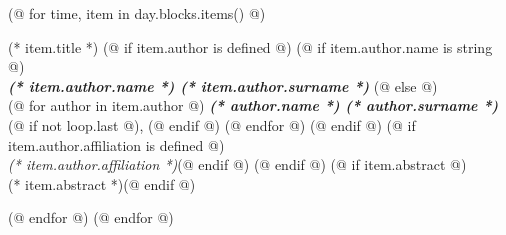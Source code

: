 \documentclass[a4paper]{report}
\begin{document}
        (@ for time, item in day.blocks.items() @)
            \begin{tcolorbox}[
                (@ if item.workshop @)
                    colback=blue!10,
                    colframe=black!50!blue,
                (@ elif item.meal @)
                    colback=red!10,
                    colframe=red!50!black,
                (@ elif item.other @)
                    colback=green!10,
                    colframe=green!50!black,
                (@ else @)
                    colback=white,
                    colframe=black!70!white,
                (@ endif @)
                fonttitle=\Large\bfseries,
                title=(* time *)
            ]
                {\Large (* item.title *)}
                (@ if item.author is defined @)
                    (@ if item.author.name is string @)
                        \\ \textbf{\textit{(* item.author.name *) (* item.author.surname *)}}
                    (@ else @)
                        \\ (@ for author in item.author @)
                            \textit{\textbf{(* author.name *) (* author.surname *)}}(@ if not loop.last @), (@ endif @)
                        (@ endfor @)
                    (@ endif @)
                    (@ if item.author.affiliation is defined @)\\ \textit{(* item.author.affiliation *)}(@ endif @)
                (@ endif @)
                (@ if item.abstract @)\\[2ex](* item.abstract *)(@ endif @)
            \end{tcolorbox}
        (@ endfor @)
    (@ endfor @)
\end{document}
